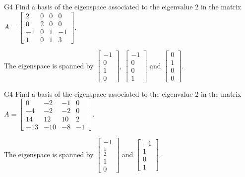 \begin{problem}{G4}
Find a basis of the eigenspace associated to the eigenvalue $2$ in the matrix $A=\begin{bmatrix} 2 & 0 & 0 & 0 \\ 0 & 2 & 0 & 0 \\ -1 & 0 & 1 & -1 \\ 1 & 0 & 1 & 3 \end{bmatrix}$.
\end{problem}
\begin{solution}
The eigenspace is spanned by $\begin{bmatrix} -1 \\ 0 \\ 1 \\ 0 \end{bmatrix}$, $\begin{bmatrix} -1 \\ 0 \\ 0 \\ 1 \end{bmatrix}$ and $\begin{bmatrix} 0 \\ 1 \\ 0 \\ 0 \end{bmatrix}$.
\end{solution}

\begin{problem}{G4}
Find a basis of the eigenspace associated to the eigenvalue $2$ in the matrix $A=\begin{bmatrix}0 & -2 & -1 & 0 \\ -4 & -2 & -2 & 0 \\ 14 & 12 & 10 & 2 \\ -13 & -10 & -8 & -1 \end{bmatrix}$.
\end{problem}
\begin{solution}
The eigenspace is spanned by $\begin{bmatrix} -1 \\ \frac{1}{2} \\ 1 \\ 0 \end{bmatrix}$ and  $\begin{bmatrix} -1 \\ 1 \\ 0 \\ 1 \end{bmatrix}$.
\end{solution}

